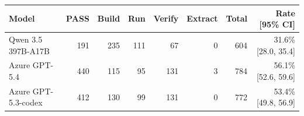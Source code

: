 \begin{tabular}{lrrrrrrr}
\toprule
Model & PASS & Build & Run & Verify & Extract & Total & Rate [95\% CI] \\
\midrule
Qwen 3.5 397B-A17B & 191 & 235 & 111 & 67 & 0 & 604 & 31.6\% [28.0, 35.4] \\
Azure GPT-5.4 & 440 & 115 & 95 & 131 & 3 & 784 & 56.1\% [52.6, 59.6] \\
Azure GPT-5.3-codex & 412 & 130 & 99 & 131 & 0 & 772 & 53.4\% [49.8, 56.9] \\
\bottomrule
\end{tabular}
